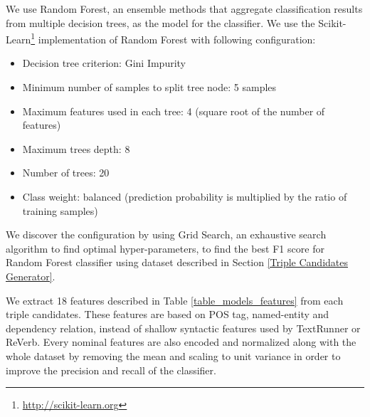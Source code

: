 \documentclass[peerreview,12pt]{IEEEtran}
\begin{document}
We use Random Forest\cite{breiman2001random}, an ensemble methods that aggregate classification results from multiple decision trees, as the model for the classifier. We use the Scikit-Learn\footnote{\url{http://scikit-learn.org}} implementation of Random Forest with following configuration:

\begin{itemize}
\item Decision tree criterion: Gini Impurity
\item Minimum number of samples to split tree node: 5 samples
\item Maximum features used in each tree: 4 (square root of the number of features)
\item Maximum trees depth: 8
\item Number of trees: 20
\item Class weight: balanced (prediction probability is multiplied by the ratio of training samples)
\end{itemize}

We discover the configuration by using Grid Search\cite{wasserman2015grid}, an exhaustive search algorithm to find optimal hyper-parameters, to find the best F1 score for Random Forest classifier using dataset described in Section \ref{Triple Candidates Generator}. 

We extract 18 features described in Table \ref{table_models_features} from each triple candidates. These features are based on POS tag, named-entity and dependency relation, instead of shallow syntactic features used by TextRunner or ReVerb\cite{banko2007open}\cite{etzioni2011open}. Every nominal features are also encoded and normalized along with the whole dataset by removing the mean and scaling to unit variance in order to improve the precision and recall of the classifier.
\end{document}
